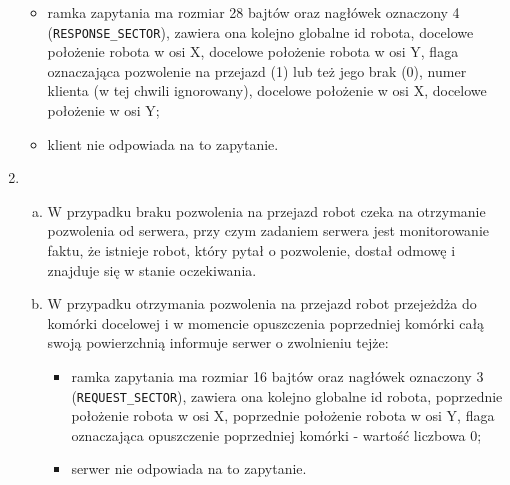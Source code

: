 \begin{enumerate}
\begin{itemize}
\item ramka zapytania ma rozmiar 28 bajtów oraz nagłówek oznaczony 4 (\texttt{RESPONSE\_SECTOR}), zawiera ona kolejno globalne id robota, docelowe położenie robota w osi X, docelowe położenie robota w osi Y, flaga oznaczająca pozwolenie na przejazd (1) lub też jego brak (0), numer klienta (w tej chwili ignorowany), docelowe położenie w osi X, docelowe położenie w osi Y;
\item klient nie odpowiada na to zapytanie.
\end{itemize}
\item\begin{enumerate}[a)]\item W przypadku braku pozwolenia na przejazd robot czeka na otrzymanie pozwolenia od serwera, przy czym zadaniem serwera jest monitorowanie faktu, że istnieje robot, który pytał o pozwolenie, dostał odmowę i znajduje się w stanie oczekiwania.
\item W przypadku otrzymania pozwolenia na przejazd robot przejeżdża do komórki docelowej i w momencie opuszczenia poprzedniej komórki całą swoją powierzchnią informuje serwer o zwolnieniu tejże:
\begin{itemize}
\item ramka zapytania ma rozmiar 16 bajtów oraz nagłówek oznaczony 3 (\texttt{REQUEST\_SECTOR}), zawiera ona kolejno globalne id robota, poprzednie położenie robota w osi X, poprzednie położenie robota w osi Y, flaga oznaczająca opuszczenie poprzedniej komórki - wartość liczbowa 0;
\item serwer nie odpowiada na to zapytanie.
\end{itemize}
\end{enumerate}
\end{enumerate}